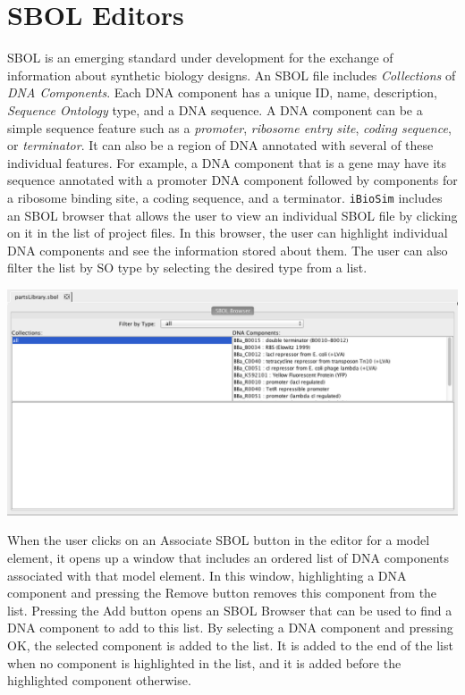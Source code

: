 \documentclass[titlepage,11pt]{article}
\begin{document}
\clearpage

\section{\label{SBOL}SBOL Editors}

SBOL is an emerging standard under development for the exchange of information about synthetic biology designs.  An SBOL file includes \emph{Collections} of \emph{DNA Components}.  Each DNA component has a unique ID, name, description, \emph{Sequence Ontology} type, and a DNA sequence.  A DNA component can be a simple sequence feature such as a \emph{promoter}, \emph{ribosome entry site}, \emph{coding sequence}, or \emph{terminator}.  It can also be a region of DNA annotated with several of these individual features.  For example, a DNA component that is a gene may have its sequence annotated with a promoter DNA component followed by components for a ribosome binding site, a coding sequence, and a terminator.  {\tt iBioSim} includes an SBOL browser that allows the user to view an individual SBOL file by clicking on it in the list of project files.  In this browser, the user can highlight individual DNA components and see the information stored about them.  The user can also filter the list by SO type by selecting the desired type from a list.

\begin{center}
\includegraphics[width=160mm]{screenshots/SBOLBrowser}
\end{center}

When the user clicks on an Associate SBOL button in the editor for a model element, it opens up a window that includes an ordered list of DNA components associated with that model element.  In this window, highlighting a DNA component and pressing the Remove button removes this component from the list.  Pressing the Add button opens an SBOL Browser that can be used to find a DNA component to add to this list.  By selecting a DNA component and pressing OK, the selected component is added to the list.  It is added to the end of the list when no component is highlighted in the list, and it is added before the highlighted component otherwise.
\end{document}
